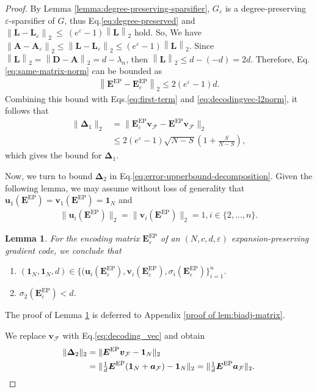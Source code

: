 \documentclass[lettersize,journal]{IEEEtran}
\newcommand{\adj}{\a}
\renewcommand{\deg}{\boldsymbol{D}}
\newcommand{\lap}{\boldsymbol{L}}
\renewcommand{\u}{\boldsymbol{u}}
\renewcommand{\v}{\boldsymbol{v}}
\newcommand{\norm}[1]{\left\lVert#1\right\rVert}
\newcommand{\ones}[1]{\boldsymbol{1}_{#1}}
\newcommand{\F}{\mathcal{F}}
\newcommand{\GEP}{\boldsymbol{E}^{\mathrm{EP}}}
\renewcommand{\a}{\boldsymbol{a}}
\renewcommand{\adj}{\boldsymbol{A}}
\newtheorem{lemma}{Lemma}
\begin{document}
{\begin{proof}
By Lemma \ref{lemma:degree-preserving-sparsifier}, $G_\varepsilon$ is a degree-preserving $\varepsilon$-sparsifier of $G$, thus Eq.\eqref{eq:degree-preserved} and $\norm{\lap - \lap_\varepsilon}_2~\le~(e^\varepsilon-1)\norm{\lap}_2$ hold. So, We have
$
    \norm{\adj - \adj_\varepsilon}_2 \leq \norm{\lap - \lap_\varepsilon}_2 \le (e^\varepsilon-1) \norm{\lap}_2.
$
Since $\norm{\lap}_2 = \norm{\deg - \adj}_2 = d-\lambda_n$, then $\norm{\lap}_2 \le d-(-d) = 2d$.
Therefore, Eq.\eqref{eq:same-matrix-norm} can be bounded as
\begin{align}
    \norm{\GEP - \GEP_\varepsilon}_2 \leq 2(e^\varepsilon-1) d.
\end{align}
Combining this bound with Eqs.\eqref{eq:first-term} and \eqref{eq:decodingvec-l2norm}, it follows that
\begin{align*}
    \|\boldsymbol{\Delta}_1\|_2&=\|\GEP_\varepsilon\v_{\F} - \GEP\v_\F\|_2 \\
    &\leq 2(e^\varepsilon-1) \sqrt{N-S}\left(1+\tfrac{S}{N-S}\right),
\end{align*}
which gives the bound for $\boldsymbol{\Delta}_1$.

Now, we turn to bound $\boldsymbol{\Delta}_2$ in Eq.\eqref{eq:error-upperbound-decomposition}.
Given the following lemma, we may assume without loss of generality that $\u_1(\GEP) = \v_1(\GEP) = \ones{N}$ and 
\begin{align}
    \|\u_i(\GEP)\|_2 = \|\v_i(\GEP)\|_2 =1, i\in \{2, \dots, n\}.
    \label{eq:othornormal-singular-basis}
\end{align}
\begin{lemma}
\label{lem:biadj-matrix}
For the encoding matrix $\GEP_\varepsilon$ of an $(N, c, d, \varepsilon)$ expansion-preserving gradient code, we conclude that
\begin{enumerate}
\renewcommand{\labelenumi}{\roman{enumi})}
    \item $(\ones{N}, \ones{N}, d)\in \{(\u_i(\GEP_\varepsilon), \v_i(\GEP_\varepsilon), \sigma_i(\GEP_\varepsilon)\}_{i=1}^n$.
    \item $\sigma_2(\GEP_\varepsilon)< d$.
\end{enumerate}
\end{lemma}
The proof of Lemma \ref{lem:biadj-matrix} is deferred to Appendix \ref{proof of lem:biadj-matrix}.

We replace $\v_\F$ with Eq.\eqref{eq:decoding_vec} and obtain
\begin{align}
    \|\boldsymbol{\Delta}_2\|_2 &=\|\GEP \v_\F - \ones{N}\|_2\notag\\
    &= \|\tfrac{1}{d}\GEP(\ones{N}+ \a_\F) - \ones{N}\|_2
    = \|\tfrac{1}{d} \GEP \a_\F\|_2.
    \label{eq:l2norm_of_decoding}
\end{align}


\end{proof}}
\end{document}
